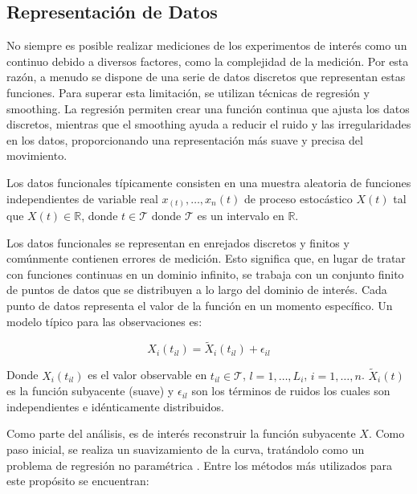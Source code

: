 \subsection{Representación de Datos}

No siempre es posible realizar mediciones de los experimentos de interés como un continuo debido a diversos factores, como la complejidad de la medición. Por esta razón, a menudo se dispone de una serie de datos discretos que representan estas funciones. Para superar esta limitación, se utilizan técnicas de regresión y smoothing. La regresión permiten crear una función continua que ajusta los datos discretos, mientras que el smoothing ayuda a reducir el ruido y las irregularidades en los datos, proporcionando una representación más suave y precisa del movimiento.

Los datos funcionales típicamente consisten en una muestra aleatoria de funciones independientes de variable real $x_(t), \dots , x_n(t)$ de proceso estocástico $X(t)$ tal que $X(t) \in \mathbb{R}$,  donde $t \in \mathcal{T}$ donde $\mathcal{T}$ es un intervalo en $\mathbb{R}$. 

Los datos funcionales se representan en enrejados discretos y finitos y comúnmente contienen errores de medición. Esto significa que, en lugar de tratar con funciones continuas en un dominio infinito, se trabaja con un conjunto finito de puntos de datos que se distribuyen a lo largo del dominio de interés. Cada punto de datos representa el valor de la función en un momento específico. Un modelo típico para las observaciones es:

\begin{equation}
     X_i(t_{il}) = \widetilde{X}_i(t_{il}) + \epsilon_{il}
\end{equation}

Donde $X_i(t_{il})$ es el valor observable en $t_{il} \in \mathcal{T}$, $l = 1, \dots, L_{i}$, $i = 1, \dots, n$. $\widetilde{X}_i(t)$ es la función subyacente (suave) y $\epsilon_{il}$ son los términos de ruidos los cuales son independientes e idénticamente distribuidos. \cite{Gertheiss}

Como parte del análisis, es de interés reconstruir la función subyacente $X$. Como paso inicial, se realiza un suavizamiento de la curva, tratándolo como un problema de regresión no paramétrica \cite{Gertheiss}. Entre los métodos más utilizados para este propósito se encuentran: 

